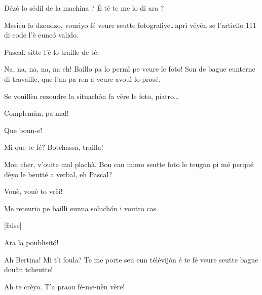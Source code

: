 \begin{drama}
\Tobiespeaks {} Dézò lo sédil de la machina ? É té te me lo di ara ?

\Bertinaspeaks Mesieu lo dzeudzo, vouriyo fé veure seutte fotografiye\ldots aprì véyèn se l’articllo 111 di code l’è eunc\'o valido.

\DzeudzoSenliquerspeaks Pascal, sitte l’è lo traille de té.

\Tobiespeaks Na, na, na, na, na eh!  Baillo pa lo permì pe veure le foto! Son de bague eunterne di travaille, que l’an pa ren a veure avouì lo prosé.

\DzeudzoSenliquerspeaks Se vouillèn rezoudre la situach\'on fa vère le foto, piatro\ldots



\DzeudzoSenliquerspeaks {} Complemàn, pa mal!

\Simonspeaks Que boun-e!

\Eumprezeospeaks Mi que te fé? Botchassa, trailla!

\DzeudzoSenliquerspeaks {} Mon cher, v'ouite mal plachà. Bon can mimo seutte foto le teugno pi mé perqué dèyo le beutté a verbal, eh Pascal?  \ok

\Pascalspeaks {} Vouè, vouè to vrèi!

\DzeudzoSenliquerspeaks Me reteurio pe baillì eunna soluchón i voutro cas.

[false]



\Ritaspeaks {} Ara la poublisitó!


\Tobiespeaks {} Ah Bertina! Mi t'i foula? Te me porte seu eun télévij\'on é te fé veure seutte bague douàn tcheutte!

\Bertinaspeaks {} Ah te crèyo. T’a praou fé-me-nèn vère! 


\end{drama}
